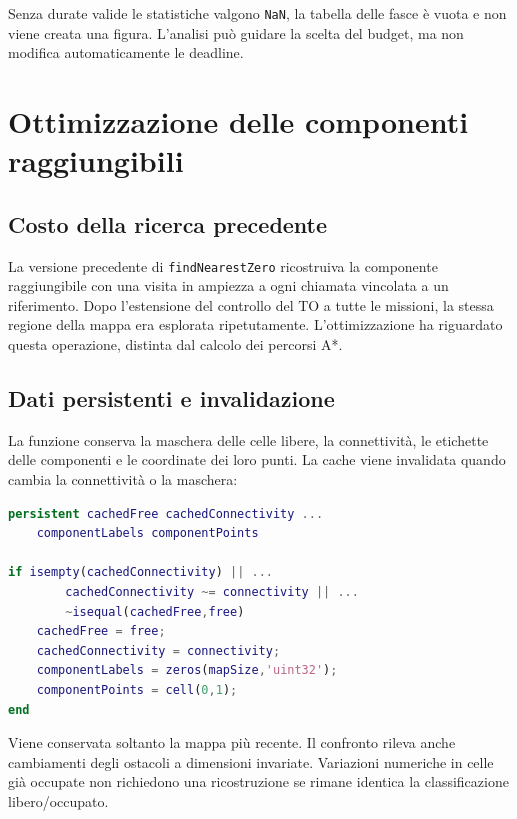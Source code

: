 Senza durate valide le statistiche valgono \texttt{NaN}, la tabella delle
fasce è vuota e non viene creata una figura. L'analisi può guidare la scelta
del budget, ma non modifica automaticamente le deadline.

\section{Ottimizzazione delle componenti raggiungibili}
\label{sec:impl-cache}

\subsection{Costo della ricerca precedente}

La versione precedente di \texttt{findNearestZero} ricostruiva la componente
raggiungibile con una visita in ampiezza a ogni chiamata vincolata a un
riferimento. Dopo l'estensione del controllo del TO a tutte le missioni,
la stessa regione della mappa era esplorata ripetutamente. L'ottimizzazione
ha riguardato questa operazione, distinta dal calcolo dei percorsi A*.

\subsection{Dati persistenti e invalidazione}

La funzione conserva la maschera delle celle libere, la connettività,
le etichette delle componenti e le coordinate dei loro punti. La cache
viene invalidata quando cambia la connettività o la maschera:

\begin{lstlisting}[language=Matlab,caption={Estratto dell'invalidazione della cache spaziale.},label={lst:impl-cache}]
persistent cachedFree cachedConnectivity ...
    componentLabels componentPoints

if isempty(cachedConnectivity) || ...
        cachedConnectivity ~= connectivity || ...
        ~isequal(cachedFree,free)
    cachedFree = free;
    cachedConnectivity = connectivity;
    componentLabels = zeros(mapSize,'uint32');
    componentPoints = cell(0,1);
end
\end{lstlisting}

Viene conservata soltanto la mappa più recente. Il confronto rileva anche
cambiamenti degli ostacoli a dimensioni invariate. Variazioni numeriche in
celle già occupate non richiedono una ricostruzione se rimane identica
la classificazione libero/occupato.

